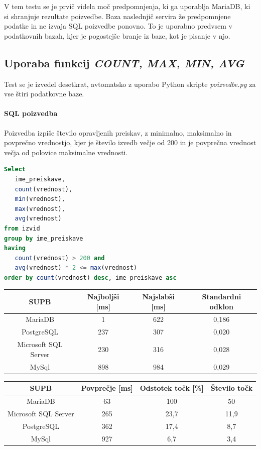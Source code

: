 \documentclass[a4paper,11pt]{report}
\begin{document}
V tem testu se je prvič videla moč predpomnjenja, ki ga uporablja MariaDB, ki si shranjuje rezultate poizvedbe.
Baza naslednjič servira že predpomnjene podatke in ne izvaja SQL poizvedbe ponovno. To je uporabno predvsem v podatkovnih bazah, kjer
je pogostejše branje iz baze, kot je pisanje v njo.

\pagebreak
\subsection{Uporaba funkcij \textit{COUNT, MAX, MIN, AVG}}
Test se je izvedel desetkrat, avtomatsko z uporabo Python skripte \textit{poizvedbe.py} za vse štiri podatkovne baze.

\paragraph{SQL poizvedba}
Poizvedba izpiše število opravljenih preiskav, z minimalno, maksimalno in povprečno vrednostjo, kjer
je število izvedb večje od 200 in je povprečna vrednost večja od polovice maksimalne vrednosti.
\begin{lstlisting}[language = SQL]
Select 
   ime_preiskave, 
   count(vrednost), 
   min(vrednost), 
   max(vrednost), 
   avg(vrednost)
from izvid
group by ime_preiskave
having 
   count(vrednost) > 200 and 
   avg(vrednost) * 2 <= max(vrednost)
order by count(vrednost) desc, ime_preiskave asc
\end{lstlisting}

\begin{center}
   \begin{tabular}{||c|c|c|c||}
      \hline
      \textbf{SUPB} & \textbf{Najboljši [ms]} & \textbf{Najslabši [ms]} & \textbf{Standardni odklon}\\
      \hline
      \hline
      MariaDB & 1 & 622 & 0,186 \\
      PostgreSQL & 237 & 307 & 0,020 \\
      Microsoft SQL Server & 230 & 316 & 0,028 \\
      MySql & 898 & 984 & 0,029\\
      \hline
   \end{tabular}
\end{center}

\begin{center}
   \begin{tabular}{||c|c|c|c||}
      \hline
      \textbf{SUPB} & \textbf{Povprečje [ms]} & \textbf{Odstotek točk [\%]} & \textbf{Število točk}\\
      \hline
      \hline
      MariaDB & 63 & 100 & 50 \\
      Microsoft SQL Server & 265 & 23,7 & 11,9 \\
      PostgreSQL & 362 & 17,4 & 8,7\\
      MySql & 927 & 6,7 & 3,4 \\
      \hline
   \end{tabular}
\end{center}
\end{document}
